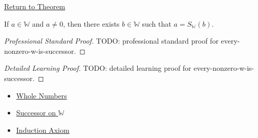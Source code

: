 \newpage
{}
\label{prf:every-nonzero-w-is-successor}

\begin{remark*}[Return]
\hyperref[thm:every-nonzero-w-is-successor]{Return to Theorem}
\end{remark*}

\begin{theorem*}
If $a\in\mathbb{W}$ and $a\neq 0$, then there exists
$b\in\mathbb{W}$ such that $a=S_{\mathbb{W}}(b)$.
\end{theorem*}

\begin{proof}[Professional Standard Proof]
\LRAProofBodyStart
TODO: professional standard proof for every-nonzero-w-is-successor.
\end{proof}

\begin{proof}[Detailed Learning Proof]
\LRAProofBodyStart
TODO: detailed learning proof for every-nonzero-w-is-successor.
\end{proof}

\begin{remark*}
\end{remark*}

\begin{dependencies}
\begin{itemize}
  \item \hyperref[def:whole-numbers]{Whole Numbers}
  \item \hyperref[def:successor-on-w]{Successor on $\mathbb{W}$}
  \item \hyperref[ax:peano-induction]{Induction Axiom}
\end{itemize}
\end{dependencies}

\clearpage
